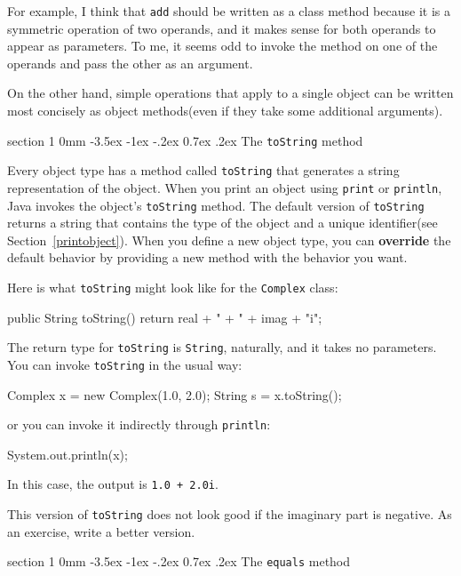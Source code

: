 \documentclass{book}
\makeatletter
\renewcommand{\section}{\@startsection 
    {section} {1} {0mm}%
    {-3.5ex \@plus -1ex \@minus -.2ex}%
    {0.7ex \@plus.2ex}%
    {\normalfont\Large\bfseries}}
\makeatother
\begin{document}
For example, I think that {\tt add} should be written as a class
method because it is a symmetric operation of two operands, and
it makes sense for both operands to appear as parameters.  To me, it
seems odd to invoke the method on one of the operands and pass
the other as an argument.

On the other hand, simple operations that apply to a single object
can be written most concisely as object methods(even if they
take some additional arguments).


\section{The {\tt toString} method}

Every object type has a method called {\tt toString} that generates
a string representation of the object.
When you print an object using {\tt print} or {\tt println},
Java invokes the object's {\tt toString} method.  The default
version of {\tt toString} returns a string that contains the type
of the object and a unique identifier(see Section~\ref{printobject}).
When you define a new object
type, you can {\bf override} the default behavior by providing a
new method with the behavior you want.

Here is what {\tt toString} might look like for the {\tt Complex}
class:

\begin{verbatimtab}
public String toString() {
    return real + " + " + imag + "i";
}
\end{verbatimtab}
%
The return type for {\tt toString} is {\tt String}, naturally,
and it takes no parameters.  You can invoke {\tt toString} in
the usual way:

\begin{verbatimtab}
    Complex x = new Complex(1.0, 2.0);
    String s = x.toString();
\end{verbatimtab}
%
or you can invoke it indirectly through {\tt println}:

\begin{verbatimtab}
    System.out.println(x);
\end{verbatimtab}
%
In this case, the output is {\tt 1.0 + 2.0i}.

This version of {\tt toString} does not look good if the imaginary
part is negative.  As an exercise, write a better version.


\section{The {\tt equals} method}
\end{document}
